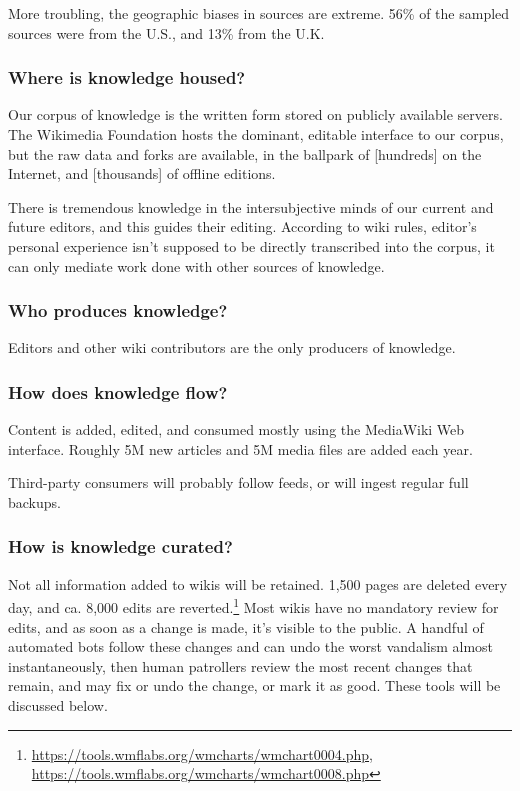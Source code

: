 \documentclass[format=sigconf, authorversion]{acmart}
\begin{document}
More troubling, the geographic biases in sources are extreme.  56\% of the sampled sources were from the U.S., and 13\% from the U.K.

\subsubsection{Where is knowledge housed?}

Our corpus of knowledge is the written form stored on publicly available servers.  The Wikimedia Foundation hosts the dominant, editable interface to our corpus, but the raw data and forks are available, in the ballpark of [hundreds] on the Internet, and [thousands] of offline editions.

There is tremendous knowledge in the intersubjective minds of our current and future editors, and this guides their editing.  According to wiki rules, editor's personal experience isn't supposed to be directly transcribed into the corpus, it can only mediate work done with other sources of knowledge.

\subsubsection{Who produces knowledge?}

Editors and other wiki contributors are the only producers of knowledge.

\subsubsection{How does knowledge flow?}

Content is added, edited, and consumed mostly using the MediaWiki Web interface.  Roughly 5M new articles and 5M media files are added each year.

Third-party consumers will probably follow feeds, or will ingest regular full backups.

\subsubsection{How is knowledge curated?}

Not all information added to wikis will be retained.  1,500 pages are deleted every day, and ca. 8,000 edits are reverted.\footnote{\url{https://tools.wmflabs.org/wmcharts/wmchart0004.php}, \url{https://tools.wmflabs.org/wmcharts/wmchart0008.php}}  Most wikis have no mandatory review for edits, and as soon as a change is made, it's visible to the public.  A handful of automated bots follow these changes and can undo the worst vandalism almost instantaneously, then human patrollers review the most recent changes that remain, and may fix or undo the change, or mark it as good.  These tools will be discussed below.
\end{document}
